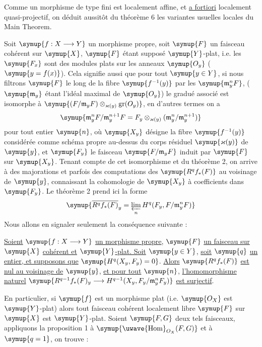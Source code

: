 Comme un morphisme de type fini est localement affine, et
\uline{a fortiori} localement quasi-projectif, on déduit aussitôt du théorème
6 les variantes usuelles locales du Main Theorem.


Soit $\symup{f:X\longrightarrow Y}$ un morphisme propre, soit $\symup{F}$ un faisceau cohérent
sur $\symup{X}$,
$\symup{F}$ étant supposé $\symup{Y}$-plat, i.e. les $\symup{F_x}$ sont des modules plats
sur les anneaux $\symup{O_y}$ ($\symup{y=f(x)}$). Cela signifie aussi que pour tout
$\symup{y\in Y}$, si nous filtrons $\symup{F}$ le long de la fibre $\symup{f^{-1}(y)}$ par les
$\symup{\mathfrak m_y^nF}$, ($\symup{\mathfrak m_y}$ étant l'idéal maximal de $\symup{O_y}$) le
gradué associé est isomorphe à
$\symup{(F/\mathfrak m_yF)\otimes_{\varkappa(y)}\operatorname{gr}(O_y)}$, en d'autres
termes on a
\[
  \symup{\mathfrak m_y^nF/\mathfrak m_y^{n+1}F
  =F_y\otimes_{\varkappa(y)}
  (\mathfrak m_y^n/\mathfrak m_y^{n+1})}
\]
pour tout entier $\symup{n}$, où $\symup{X_y}$ désigne la fibre $\symup{f^{-1}(y)}$ considérée comme
schéma propre au-dessus du corps résiduel $\symup{\varkappa(y)}$ de $\symup{y}$, et $\symup{F_y}$ le
faisceau $\symup{F/\mathfrak m_yF}$ induit par $\symup{F}$ sur $\symup{X_y}$. Tenant compte de cet
isomorphisme et du théorème 2, on arrive à des majorations et parfois des
computations des $\symup{R^qf_*(F)}$ au voisinage de $\symup{y}$, connaissant la cohomologie de
$\symup{X_y}$ à coefficients dans $\symup{F_y}$. Le théorème 2 prend ici la forme
\[
  \symup{\overline{R^qf_*(F)}_y
  =\varprojlim\limits_n H^q(F_y,F/\mathfrak m_y^nF)}
\]
Nous allons en signaler seulement la conséquence suivante :

 \uline{Soient} $\symup{f:X\longrightarrow Y}$ \uline{un morphisme propre},
$\symup{F}$ \uline{un faisceau sur} $\symup{X}$ \uline{cohérent et} $\symup{Y}$\uline{-plat. Soit} $\symup{y\in Y}$, \uline{soit} $\symup{q}$ \uline{un
entier, et supposons que} $\symup{H^q(X_y,F_y)=0}$. \uline{Alors} $\symup{R^qf_*(F)}$ \uline{est nul au
voisinage de} $\symup{y}$, \uline{et pour tout} $\symup{n}$, \uline{l'homomorphisme naturel}
$\symup{R^{q-1}f_*(F)_y\longrightarrow H^{q-1}(X_y,F_y/\mathfrak m_y^nF_y)}$
\uline{est surjectif}.

En particulier, si $\symup{f}$ est un morphisme plat (i.e. $\symup{O_X}$ est $\symup{Y}$-plat)
alors tout faisceau cohérent localement libre $\symup{F}$ sur $\symup{X}$ est $\symup{Y}$-plat. Soient
$\symup{F,G}$ deux tels faisceaux, appliquons la proposition 1 à
$\symup{\mathop{\text{\uwave{Hom}}}\nolimits_{O_X}(F,G)}$ et à $\symup{q=1}$, on trouve :

